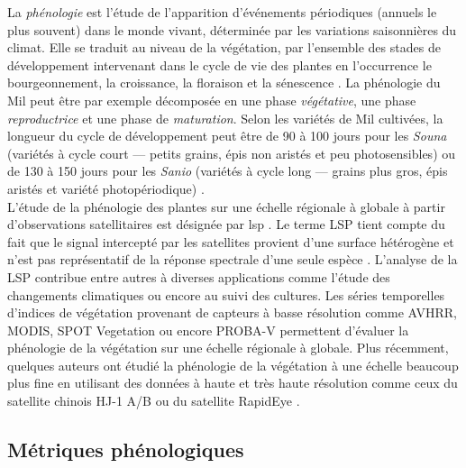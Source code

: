 La \emph{phénologie} 
est l’étude de l’apparition d’événements périodiques (annuels le plus souvent) dans le monde vivant, déterminée par les variations saisonnières du climat. Elle se traduit au niveau de 
la végétation, par l’ensemble des stades de développement intervenant dans le cycle de vie des plantes en l’occurrence le bourgeonnement, la croissance, la floraison et la 
sénescence \citep{Kimball2014}. La phénologie du Mil peut être par exemple décomposée en une phase \emph{végétative}, une phase \emph{reproductrice} et une phase de 
\emph{maturation}. Selon les variétés de Mil cultivées, la longueur du cycle de développement peut être de 90 à 100 jours pour les \emph{Souna} (variétés à cycle court --- 
petits grains, épis non aristés et peu photosensibles) ou de 130 à 150 jours pour les \emph{Sanio} (variétés à cycle long --- grains plus gros, épis aristés et variété photopériodique) \citep{Diouf2001}.
\\L'\'etude de la phénologie des plantes sur une échelle régionale à globale à partir d’observations satellitaires est désignée par \acrfull{lsp} \citep{Helman2018}. Le terme LSP 
tient compte du fait que le signal intercepté par les satellites provient d’une surface hétérogène et n’est pas représentatif de la réponse spectrale d’une seule espèce 
\citep{Kimball2014}. L'analyse de la LSP contribue entre autres à diverses applications comme l’étude des changements climatiques \citep{Begue2014} ou encore au suivi des
cultures. Les séries temporelles d’indices de végétation provenant de capteurs à basse résolution comme AVHRR, MODIS, SPOT Vegetation ou encore PROBA-V permettent d’évaluer 
la phénologie de la végétation sur une échelle régionale à globale. Plus récemment, quelques auteurs ont étudié la phénologie de la végétation à une échelle beaucoup plus fine en utilisant des données
à haute et très haute résolution comme ceux du satellite chinois HJ-1 A/B \citep{Pan2015} ou du satellite RapidEye \citep{Vrieling2017}.

  \subsection{Métriques phénologiques}


